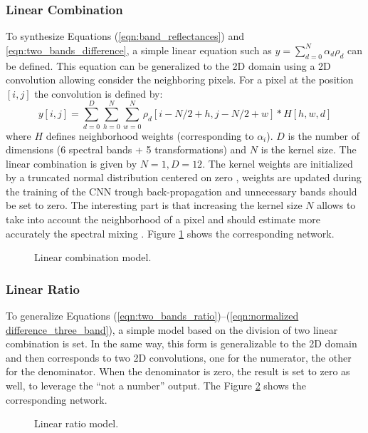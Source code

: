 \documentclass[../thesis.tex]{subfiles}
\begin{document}
	\subsubsection{Linear Combination} To synthesize Equations (\ref{eqn:band_reflectances}) and \eqref{eqn:two_bands_difference}, a simple linear equation such as $y = \sum_{d=0}^{N}{\alpha_d \rho_d}$ can be defined. This equation can be generalized to the 2D domain using a 2D convolution allowing consider the neighboring pixels. For a pixel at the position $[i,j]$ the convolution is defined by:
	\begin{equation} y[i,j] = \sum_{d=0}^{D} \sum_{h=0}^{N}\sum_{w=0}^{N}{\rho_d[i-N/2+h,j-N/2+w] \ast H[h,w,d]}  \end{equation}
	where $H$ defines neighborhood weights (corresponding to $\alpha_i$). $D$ is the number of dimensions (6 spectral bands + 5 transformations) and $N$ is the kernel size. The linear combination is given by $N=1, D=12$. The kernel weights are initialized by a truncated normal distribution centered on zero \cite{he_normal}, weights are updated during the training of the CNN trough back-propagation and unnecessary bands should be set to zero. The interesting part is that increasing the kernel size $N$ allows to take into account the neighborhood of a pixel and should estimate more accurately the spectral mixing \cite{Louargant2017}. Figure \ref{fig:linear} shows the corresponding network.
	
	\begin{figure}[H]
		\centering
		
		\caption{Linear combination model.}
		\label{fig:linear}
	\end{figure}
	
	
	\subsubsection{Linear Ratio} To generalize Equations (\ref{eqn:two_bands_ratio})--(\ref{eqn:normalized difference_three_band}), a simple model based on the division of two linear combination is set. In the same way, this form is generalizable to the 2D domain and then corresponds to two 2D convolutions, one for the numerator, the other for the denominator. When the denominator is zero, the result is set to zero as well, to leverage the ``not a number'' output. The Figure \ref{fig:linear-ratio} shows the corresponding network.
	
	\begin{figure}[H]
		\centering
		
		\caption{ {Linear} ratio model.}
		\label{fig:linear-ratio}
	\end{figure}%
	
\end{document}
